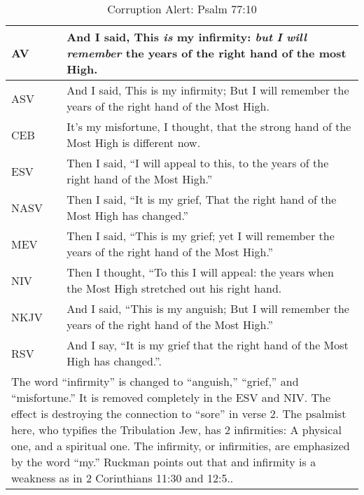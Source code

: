 \begin{center}

\begin{table}[ht]
\centering
\begin{tabular}{|p{.5in}|p{3.5in}|}
\hline

\textcolor[rgb]{0.00,0.00,1.00}{AV} & \textcolor[rgb]{0.00,0.00,1.00}{And I said, This \emph{is} my infirmity: \emph{but} \emph{I} \emph{will} \emph{remember} the years of the right hand of the most High.} \\ \hline 

\hline
\hline


ASV &  And I said, This is my infirmity; But I will remember the years of the right hand of the Most High. \\ \hline
%
CEB &  It’s my misfortune, I thought,  that the strong hand of the Most High is different now.\\ \hline
%
ESV & Then I said, ``I will appeal to this, to the years of the right hand of the Most High.'' \\ \hline
%
NASV &  Then I said, “It is my grief, That the right hand of the Most High has changed.” \\ \hline
%
MEV & Then I said, “This is my grief;  yet I will remember the years of the right hand of the Most High.” \\ \hline
%
NIV &  Then I thought, “To this I will appeal:  the years when the Most High stretched out his right hand. \\ \hline
%
NKJV &  And I said, “This is my anguish;
But I will remember the years of the right hand of the Most High.”\\ \hline
%
RSV &  And I say, “It is my grief that the right hand of the Most High has changed.”. \\ \hline

\hline
\hline

\multicolumn{2}{|p{4.3in}|}{{\textcolor{jungle}{The word ``infirmity'' is changed to “anguish,” “grief,” and “misfortune.” It is removed completely in the ESV and NIV. The effect is destroying the connection to “sore” in verse 2. The psalmist here, who typifies the Tribulation Jew, has 2 infirmities: A physical one, and a spiritual one. The infirmity, or infirmities, are emphasized by the word ``my.'' Ruckman points out that and infirmity is a weakness as in 2 Corinthians 11:30 and 12:5.\cite{Ruckman1992PsalmsV2}.}}} \\ \hline

\end{tabular}
\caption[Corruption Alert: Psalm 77:10]{Corruption Alert: Psalm 77:10} \label{table:Corruption Psalm 77:10}

\end{table}

\end{center}


